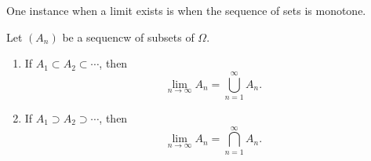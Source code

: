 One instance when a limit exists is when the sequence of sets is monotone.

\begin{proposition}
Let $(A_n)$ be a sequencw of subsets of $\Omega$.
\begin{enumerate}[label=(\arabic*)]
\item If $A_1\subset A_2\subset\cdots$, then
\[\lim_{n\to\infty}A_n=\bigcup_{n=1}^{\infty}A_n.\]
\item If $A_1\supset A_2\supset\cdots$, then
\[\lim_{n\to\infty}A_n=\bigcap_{n=1}^{\infty}A_n.\]
\end{enumerate}
\end{proposition}


